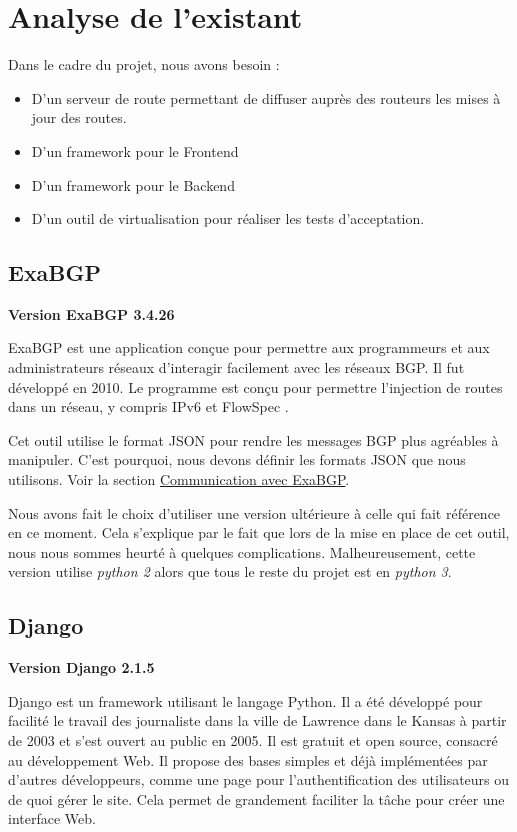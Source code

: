 \chapter{Analyse de l'existant}

Dans le cadre du projet, nous avons besoin : 

\begin{itemize}
    \item D'un serveur de route permettant de diffuser auprès des routeurs les mises à jour des routes.
    \item D'un framework pour le Frontend
    \item D'un framework pour le Backend
    \item D'un outil de virtualisation pour réaliser les tests d'acceptation.
\end{itemize}

\section{ExaBGP}
\textbf{Version ExaBGP 3.4.26}

ExaBGP \cite{Exa13} est une application conçue pour permettre aux programmeurs et aux administrateurs réseaux d’interagir facilement avec les réseaux BGP. Il fut développé en 2010. Le programme est conçu pour permettre l’injection de routes dans un réseau, y compris IPv6 et FlowSpec \cite{Man10}.

Cet outil utilise le format JSON pour rendre les messages BGP plus agréables à manipuler. C'est pourquoi, nous devons définir les formats JSON que nous utilisons. Voir la section \hyperref[sssec:exabgp]{Communication avec ExaBGP}.

Nous avons fait le choix d'utiliser une version ultérieure à celle qui fait référence en ce moment. Cela s'explique par le fait que lors de la mise en place de cet outil, nous nous sommes heurté à quelques complications. Malheureusement, cette version utilise \textit{python 2} alors que tous le reste du projet est en \textit{python 3}.

\section{Django}
\textbf{Version Django 2.1.5}

Django \cite{Django03} est un framework utilisant le langage Python. Il a été développé pour facilité le travail des journaliste dans la ville de Lawrence dans le Kansas à partir de 2003 et s'est ouvert au public en 2005. Il est gratuit et open source, consacré au développement Web. Il propose des bases simples et déjà implémentées par d'autres développeurs, comme une page pour l'authentification des utilisateurs ou de quoi gérer le site. Cela permet de grandement faciliter la tâche pour créer une interface Web. 

